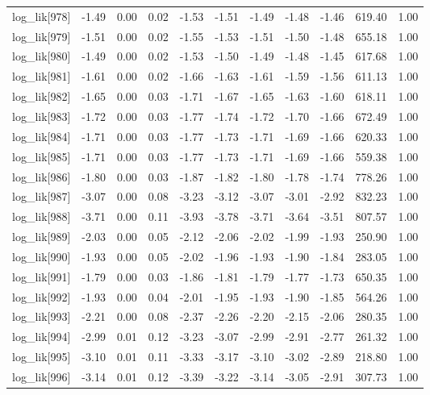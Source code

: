 \begin{table}[ht]
\begin{tabular}{rrrrrrrrrrr}
  log\_lik[978] & -1.49 & 0.00 & 0.02 & -1.53 & -1.51 & -1.49 & -1.48 & -1.46 & 619.40 & 1.00 \\ 
  log\_lik[979] & -1.51 & 0.00 & 0.02 & -1.55 & -1.53 & -1.51 & -1.50 & -1.48 & 655.18 & 1.00 \\ 
  log\_lik[980] & -1.49 & 0.00 & 0.02 & -1.53 & -1.50 & -1.49 & -1.48 & -1.45 & 617.68 & 1.00 \\ 
  log\_lik[981] & -1.61 & 0.00 & 0.02 & -1.66 & -1.63 & -1.61 & -1.59 & -1.56 & 611.13 & 1.00 \\ 
  log\_lik[982] & -1.65 & 0.00 & 0.03 & -1.71 & -1.67 & -1.65 & -1.63 & -1.60 & 618.11 & 1.00 \\ 
  log\_lik[983] & -1.72 & 0.00 & 0.03 & -1.77 & -1.74 & -1.72 & -1.70 & -1.66 & 672.49 & 1.00 \\ 
  log\_lik[984] & -1.71 & 0.00 & 0.03 & -1.77 & -1.73 & -1.71 & -1.69 & -1.66 & 620.33 & 1.00 \\ 
  log\_lik[985] & -1.71 & 0.00 & 0.03 & -1.77 & -1.73 & -1.71 & -1.69 & -1.66 & 559.38 & 1.00 \\ 
  log\_lik[986] & -1.80 & 0.00 & 0.03 & -1.87 & -1.82 & -1.80 & -1.78 & -1.74 & 778.26 & 1.00 \\ 
  log\_lik[987] & -3.07 & 0.00 & 0.08 & -3.23 & -3.12 & -3.07 & -3.01 & -2.92 & 832.23 & 1.00 \\ 
  log\_lik[988] & -3.71 & 0.00 & 0.11 & -3.93 & -3.78 & -3.71 & -3.64 & -3.51 & 807.57 & 1.00 \\ 
  log\_lik[989] & -2.03 & 0.00 & 0.05 & -2.12 & -2.06 & -2.02 & -1.99 & -1.93 & 250.90 & 1.00 \\ 
  log\_lik[990] & -1.93 & 0.00 & 0.05 & -2.02 & -1.96 & -1.93 & -1.90 & -1.84 & 283.05 & 1.00 \\ 
  log\_lik[991] & -1.79 & 0.00 & 0.03 & -1.86 & -1.81 & -1.79 & -1.77 & -1.73 & 650.35 & 1.00 \\ 
  log\_lik[992] & -1.93 & 0.00 & 0.04 & -2.01 & -1.95 & -1.93 & -1.90 & -1.85 & 564.26 & 1.00 \\ 
  log\_lik[993] & -2.21 & 0.00 & 0.08 & -2.37 & -2.26 & -2.20 & -2.15 & -2.06 & 280.35 & 1.00 \\ 
  log\_lik[994] & -2.99 & 0.01 & 0.12 & -3.23 & -3.07 & -2.99 & -2.91 & -2.77 & 261.32 & 1.00 \\ 
  log\_lik[995] & -3.10 & 0.01 & 0.11 & -3.33 & -3.17 & -3.10 & -3.02 & -2.89 & 218.80 & 1.00 \\ 
  log\_lik[996] & -3.14 & 0.01 & 0.12 & -3.39 & -3.22 & -3.14 & -3.05 & -2.91 & 307.73 & 1.00 \\ 

\end{tabular}
\end{table}
